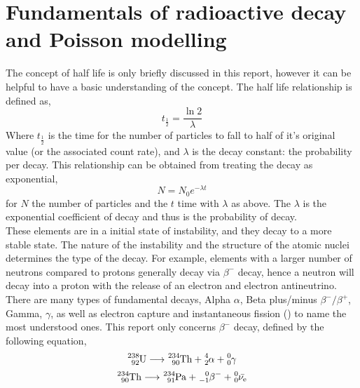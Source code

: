 \documentclass[11pt]{article}
\begin{document}
    \section{Fundamentals of radioactive decay and Poisson modelling}
    The concept of half life is only briefly discussed in this report, however it can be helpful to have a basic understanding of the concept. The half life relationship is defined as,
    \begin{equation}
        t_{\frac{1}{2}} = \frac{\ln{2}}{\lambda}
    \end{equation}
    Where $ t_{\frac{1}{2}}$ is the time for the number of particles to fall to half of it's original value (or the associated count rate), and $\lambda$ is the decay constant: the probability per decay. This relationship can be obtained from treating the decay as exponential, 
    \begin{equation}
  N = N_0 e^{-\lambda t}
    \end{equation}
    for $N$ the number of particles and the $t$ time with $\lambda$ as above.  The $\lambda$ is the exponential coefficient of decay and thus is the probability of decay. 
   \\
   These elements are in a initial state of instability, and they decay to a more stable state. The nature of the instability and the structure of the atomic nuclei determines the type of the decay. For example, elements with a larger number of neutrons compared to protons generally decay via $\beta^{-}$ decay, hence a neutron will decay into a proton with the release of an electron and electron antineutrino. 
   There are many types of fundamental decays, Alpha $\alpha$, Beta plus/minus $\beta^{-}/\beta^{+}$, Gamma, $\gamma$, as well as electron capture and instantaneous fission (\cite{Magill2005}) to name the most understood ones. This report only concerns $\beta^{-}$ decay, defined by the following equation,
    \begin{equation}
    \ce{^{238}_{92}U} \longrightarrow \ce{^{234}_{90}Th} + \ce{^{4}_{2}\alpha} + \ce{^{0}_{0}\gamma}
\end{equation}
\begin{equation}
    \ce{^{234}_{90}Th} \longrightarrow \ce{^{234}_{91}Pa} + \ce{^{0}_{-1}\beta^{-}} + \ce{^{0}_{0}\bar{\nu_{e}}}
\end{equation}
\end{document}
